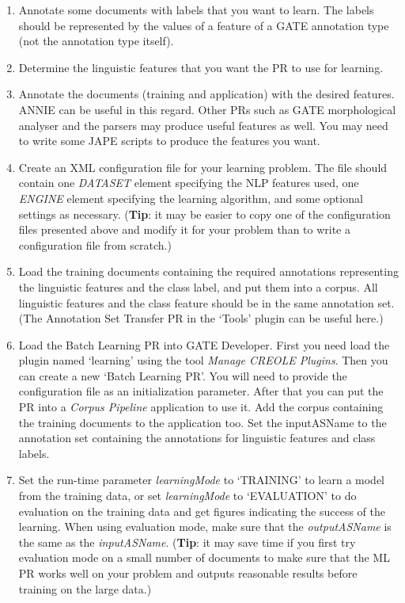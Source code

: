 \begin{enumerate}
  
\item Annotate some documents with labels that you want to learn.
The labels should be represented by the values of a feature of a
GATE annotation type (not the annotation type itself).

\item Determine the linguistic features that you want the PR to use for
learning.

\item Annotate the documents (training and application) with the desired
features. ANNIE can be useful in this regard. Other PRs such as GATE
morphological analyser and the parsers may produce useful features as well. You
may need to write some JAPE scripts to produce the features you want.

\item Create an XML configuration file for your learning problem. The file should
contain one {\em DATASET} element specifying the NLP features used, one {\em
ENGINE} element specifying the learning algorithm, and some optional settings as
necessary. ({\bf Tip}: it may be easier to copy one of the configuration files
presented above and modify it for your problem than to write a configuration file
from scratch.)

\item Load the training documents containing the required annotations
representing the linguistic features and the class label, and put them into a
corpus. All linguistic features and the class feature should be in the same
annotation set. (The Annotation Set Transfer PR in the `Tools' plugin can be
useful here.)

\item Load the Batch Learning PR into GATE Developer.  First you need load the
plugin named `learning' using the tool {\em Manage CREOLE Plugins}. Then you
can create a new `Batch Learning PR'. You will need to provide the
configuration file as an initialization parameter. After that you can put the PR
into a {\em Corpus Pipeline} application to use it. Add the corpus containing the
training documents to the application too. Set the inputASName to the annotation
set containing the annotations for linguistic features and class labels.

\item Set the run-time parameter {\em learningMode} to `TRAINING' to learn a
model from the training data, or set {\em learningMode} to `EVALUATION' to do
evaluation on the training data and get figures indicating the success of the
learning. When using evaluation mode, make sure that the {\em outputASName}
is the same as the {\em inputASName}. ({\bf Tip}: it may save time if you first
try evaluation mode on a small number of documents to make sure that the ML
PR works well on your problem and outputs reasonable results before training on
the large data.)


\end{enumerate}
